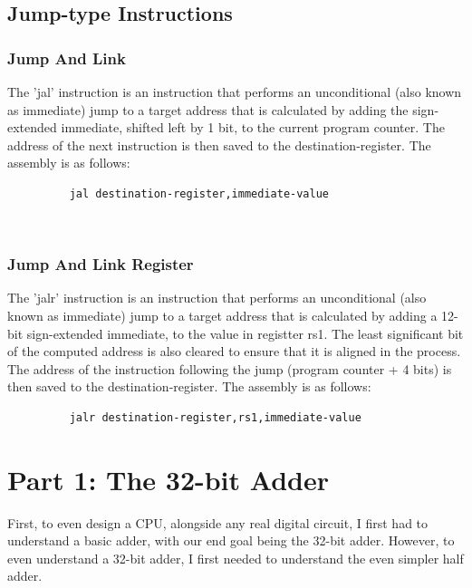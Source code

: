 \documentclass{article}
\begin{document}
\subsection{Jump-type Instructions}

\subsubsection{Jump And Link}
\qquad
The 'jal' instruction is an instruction that performs an unconditional (also known as immediate) jump to a target address that is calculated by adding the sign-extended immediate, shifted left by 1 bit, to the current program counter. The address of the next instruction is then saved to the destination-register. The assembly is as follows:
\begin{figure}[!htbp]
    \centering
    \begin{verbatim}
    jal destination-register,immediate-value
    \end{verbatim}
\end{figure}\newline
\\
\newpage
\subsubsection{Jump And Link Register}
\qquad
The 'jalr' instruction is an instruction that performs an unconditional (also known as immediate) jump to a target address that is calculated by adding a 12-bit sign-extended immediate, to the value in registter rs1. The least significant bit of the computed address is also cleared to ensure that it is aligned in the process. The address of the instruction following the jump (program counter + 4 bits) is then saved to the destination-register. The assembly is as follows:
\begin{figure}[!htbp]
    \centering
    \begin{verbatim}
    jalr destination-register,rs1,immediate-value
    \end{verbatim}
\end{figure}\newline



\newpage
\section{Part 1: The 32-bit Adder}
\qquad
First, to even design a CPU, alongside any real digital circuit, I first had to understand a basic adder, with our end goal being the 32-bit adder. However, to even understand a 32-bit adder, I first needed to understand the even simpler half adder.
\end{document}
